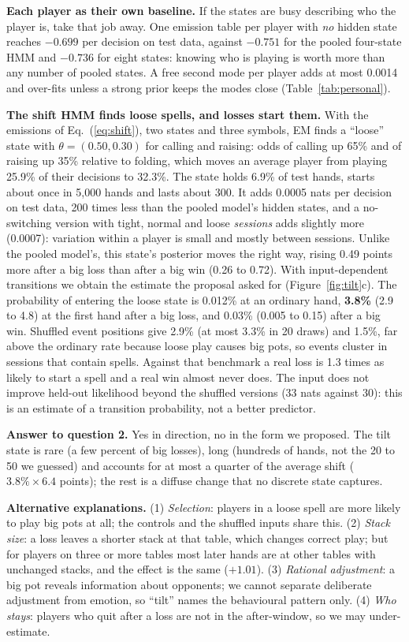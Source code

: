 \documentclass{article}
\begin{document}
\textbf{Each player as their own baseline.} If the states are busy describing who the player is, take that job away. One emission table per player with \emph{no} hidden state reaches $-0.699$ per decision on test data, against $-0.751$ for the pooled four-state HMM and $-0.736$ for eight states: knowing who is playing is worth more than any number of pooled states. A free second mode per player adds at most 0.0014 and over-fits unless a strong prior keeps the modes close (Table~\ref{tab:personal}).

\textbf{The shift HMM finds loose spells, and losses start them.} With the emissions of Eq.~(\ref{eq:shift}), two states and three symbols, EM finds a ``loose'' state with $\theta=(0.50,0.30)$ for calling and raising: odds of calling up 65\% and of raising up 35\% relative to folding, which moves an average player from playing 25.9\% of their decisions to 32.3\%. The state holds 6.9\% of test hands, starts about once in 5{,}000 hands and lasts about 300. It adds 0.0005 nats per decision on test data, 200 times less than the pooled model's hidden states, and a no-switching version with tight, normal and loose \emph{sessions} adds slightly more (0.0007): variation within a player is small and mostly between sessions. Unlike the pooled model's, this state's posterior moves the right way, rising 0.49 points more after a big loss than after a big win (0.26 to 0.72). With input-dependent transitions we obtain the estimate the proposal asked for (Figure~\ref{fig:tilt}c). The probability of entering the loose state is 0.012\% at an ordinary hand, \textbf{3.8\%} (2.9 to 4.8) at the first hand after a big loss, and 0.03\% (0.005 to 0.15) after a big win. Shuffled event positions give 2.9\% (at most 3.3\% in 20 draws) and 1.5\%, far above the ordinary rate because loose play causes big pots, so events cluster in sessions that contain spells. Against that benchmark a real loss is 1.3 times as likely to start a spell and a real win almost never does. The input does not improve held-out likelihood beyond the shuffled versions (33 nats against 30): this is an estimate of a transition probability, not a better predictor.

\textbf{Answer to question 2.} Yes in direction, no in the form we proposed. The tilt state is rare (a few percent of big losses), long (hundreds of hands, not the 20 to 50 we guessed) and accounts for at most a quarter of the average shift ($3.8\%\times6.4$ points); the rest is a diffuse change that no discrete state captures.

\textbf{Alternative explanations.} (1) \emph{Selection}: players in a loose spell are more likely to play big pots at all; the controls and the shuffled inputs share this. (2) \emph{Stack size}: a loss leaves a shorter stack at that table, which changes correct play; but for players on three or more tables most later hands are at other tables with unchanged stacks, and the effect is the same ($+1.01$). (3) \emph{Rational adjustment}: a big pot reveals information about opponents; we cannot separate deliberate adjustment from emotion, so ``tilt'' names the behavioural pattern only. (4) \emph{Who stays}: players who quit after a loss are not in the after-window, so we may under-estimate.
\end{document}
